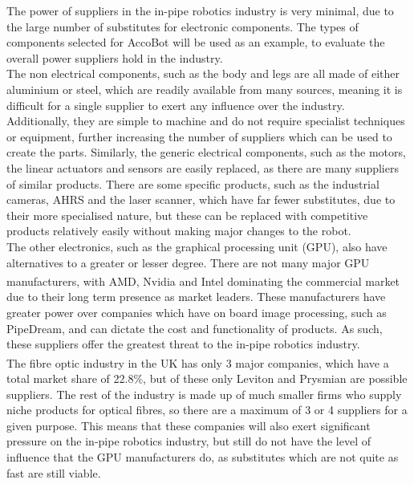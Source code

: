 \documentclass[11pt]{article}		%
\newcommand{\supercite}[1]{\textsuperscript{\cite{#1}}}		%
\begin{document}
				The power of suppliers in the in-pipe robotics industry is very minimal, due to the large number of substitutes for electronic components.
				The types of components selected for AccoBot will be used as an example, to evaluate the overall power suppliers hold in the industry.
				\\
                \hspace*{2ex}The non electrical components, such as the body and legs are all made of either aluminium or steel, which are readily available from many sources, meaning it is difficult for a single supplier to exert any influence over the industry.
				Additionally, they are simple to machine and do not require specialist techniques or equipment, further increasing the number of suppliers which can be used to create the parts.
				Similarly, the generic electrical components, such as the motors, the linear actuators and sensors are easily replaced, as there are many suppliers of similar products.
				There are some specific products, such as the industrial cameras, AHRS and the laser scanner, which have far fewer substitutes, due to their more specialised nature, but these can be replaced with competitive products relatively easily without making major changes to the robot.
				\\
                \hspace*{2ex}The other electronics, such as the graphical processing unit (GPU), also have alternatives to a greater or lesser degree.
				There are not many major GPU manufacturers, with AMD, Nvidia and Intel dominating the commercial market\supercite{rake2020graphic} due to their long term presence as market leaders.
				These manufacturers have greater power over companies which have on board image processing, such as PipeDream, and can dictate the cost and functionality of  products.
				As such, these suppliers offer the greatest threat to the in-pipe robotics industry.
				\\
                \hspace*{2ex}The fibre optic industry in the UK has only 3 major companies\supercite{neve2020fibreoptic}, which have a total market share of 22.8\%, but of these only Leviton and Prysmian are possible suppliers.
				The rest of the industry is made up of much smaller firms who supply niche products for optical fibres, so there are a maximum of 3 or 4 suppliers for a given purpose.
				This means that these companies will also exert significant pressure on the in-pipe robotics industry, but still do not have the level of influence that the GPU manufacturers do, as substitutes which are not quite as fast are still viable.
\end{document}
